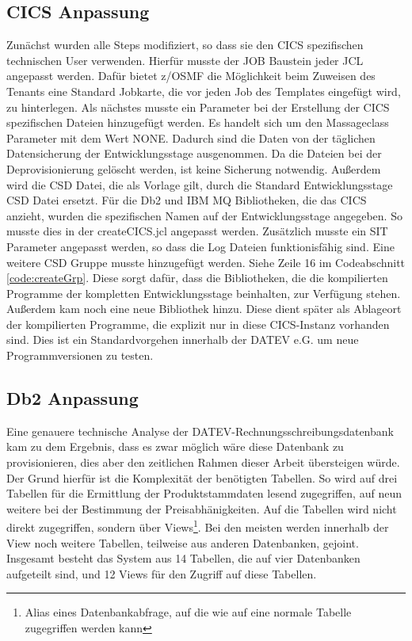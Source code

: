 \subsection{CICS Anpassung}
Zunächst wurden alle Steps modifiziert, so dass sie den CICS spezifischen technischen User verwenden.
Hierfür musste der \glqq JOB\grqq{} Baustein jeder JCL angepasst werden.
Dafür bietet z/OSMF die Möglichkeit beim Zuweisen des \glqq Tenants\grqq{} eine Standard Jobkarte, die vor jeden Job des Templates eingefügt wird, zu hinterlegen.
Als nächstes musste ein Parameter bei der Erstellung der CICS spezifischen Dateien hinzugefügt werden.
Es handelt sich um den Massageclass Parameter mit dem Wert \glqq NONE\grqq.
Dadurch sind die Daten von der täglichen Datensicherung der Entwicklungsstage ausgenommen.
Da die Dateien bei der Deprovisionierung gelöscht werden, ist keine Sicherung notwendig.
Außerdem wird die CSD Datei, die als Vorlage gilt, durch die Standard Entwicklungsstage CSD Datei ersetzt.
Für die Db2 und IBM MQ Bibliotheken, die das CICS anzieht, wurden die spezifischen Namen auf der Entwicklungsstage angegeben.
So musste dies in der \glqq createCICS.jcl\grqq{} angepasst werden.
Zusätzlich musste ein SIT Parameter angepasst werden, so dass die Log Dateien funktionisfähig sind.
Eine weitere CSD Gruppe musste hinzugefügt werden.
Siehe Zeile 16 im Codeabschnitt \ref{code:createGrp}.
Diese sorgt dafür, dass die Bibliotheken, die die kompilierten Programme der kompletten Entwicklungsstage beinhalten, zur Verfügung stehen.
Außerdem kam noch eine neue Bibliothek hinzu.
Diese dient später als Ablageort der kompilierten Programme, die explizit nur in diese CICS-Instanz vorhanden sind.
Dies ist ein Standardvorgehen innerhalb der DATEV e.G. um neue Programmversionen zu testen.

\subsection{Db2 Anpassung}\label{ssec:db2entw}
Eine genauere technische Analyse der DATEV-Rechnungsschreibungsdatenbank kam zu dem  Ergebnis, dass es zwar möglich wäre diese Datenbank zu provisionieren, dies aber den zeitlichen Rahmen dieser Arbeit übersteigen würde.
Der Grund hierfür ist die Komplexität der benötigten Tabellen.
So wird auf drei Tabellen für die Ermittlung der Produktstammdaten lesend zugegriffen, auf neun weitere bei der Bestimmung der Preisabhänigkeiten.
Auf die Tabellen wird nicht direkt zugegriffen, sondern über Views\footnote{Alias eines Datenbankabfrage, auf die wie auf eine normale Tabelle zugegriffen werden kann}.
Bei den meisten werden innerhalb der View noch weitere Tabellen, teilweise aus anderen Datenbanken, gejoint.
Insgesamt besteht das System aus 14 Tabellen, die auf vier Datenbanken aufgeteilt sind, und 12 Views für den Zugriff auf diese Tabellen.

